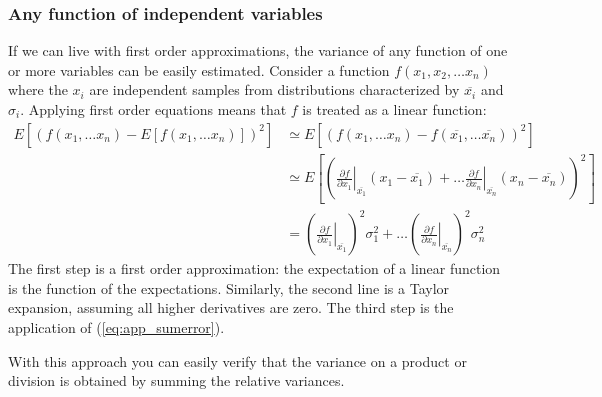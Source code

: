 \documentclass[11pt,oneside]{article}
\begin{document}
\subsubsection{Any function of independent variables}
If we can live with first order approximations, the variance of any function
of one or more variables can be easily estimated. Consider a function
$f(x_1, x_2, \ldots x_n)$ where the $x_i$ are independent samples from
distributions characterized by $\overline{x_i}$ and $\sigma_i$. Applying first order
equations means that $f$ is treated as a linear function:
\begin{align}
  E\left[\left( f(x_1, \ldots x_n) - E\left[f(x_1, \ldots x_n)\right]\right)^2\right]
  &\simeq  E\left[\left( f(x_1,\ldots x_n) 
        - f(\overline{x_1}, \ldots \overline{x_n})\right)^2\right] \nonumber \\
  &\simeq  E\left[\left( \left. \frac{\partial f}{\partial x_1} \right|_{\overline{x_1}}
                 (x_1 - \overline{x_1}) + \ldots
            \left. \frac{\partial f}{\partial x_n} \right|_{\overline{x_n}}
                 (x_n - \overline{x_n}) \right)^2\right] \nonumber \\
  &= \left( \left. \frac{\partial f}{\partial x_1} \right|_{\overline{x_1}} \right)^2
        \sigma_1^2 + \ldots
    \left( \left. \frac{\partial f}{\partial x_n} \right|_{\overline{x_n}} \right)^2
         \sigma_n^2
\end{align}
The first step is a first order approximation: the expectation of a linear
function is the function of the expectations. Similarly, the second line is a
Taylor expansion, assuming all higher derivatives are zero. The third step is
the application of (\ref{eq:app_sumerror}).

With this approach you can easily verify that the variance on a product or
division is obtained by summing the relative variances.

\newpage
\end{document}
